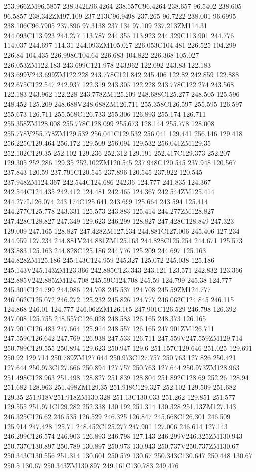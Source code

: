 253.966ZM96.5857 238.342L96.4264 238.657C96.4264 238.657 96.5402 238.605 96.5857 238.342ZM97.109 237.213C96.9498 237.265 96.7222 238.001 96.6995 238.106C96.7905 237.896 97.3138 237.134 97.109 237.213ZM114.31 244.093C113.923 244.277 113.787 244.355 113.923 244.329C113.901 244.776 114.037 244.697 114.31 244.093ZM105.027 226.053C104.481 226.525 104.299 226.84 104.435 226.998C104.64 226.683 104.822 226.368 105.027 226.053ZM122.183 243.699C121.978 243.962 122.092 243.83 122.183 243.699V243.699ZM122.228 243.778C121.842 245.406 122.82 242.859 122.888 242.675C122.547 242.937 122.319 243.305 122.228 243.778C122.274 243.568 122.183 243.962 122.228 243.778ZM125.209 248.688C125.277 248.505 125.596 248.452 125.209 248.688V248.688ZM126.711 255.358C126.597 255.595 126.597 255.673 126.711 255.568C126.733 255.306 126.893 255.174 126.711 255.358ZM128.008 255.778C128.099 255.673 128.144 255.778 128.008 255.778V255.778ZM129.532 256.041C129.532 256.041 129.441 256.146 129.418 256.225C129.464 256.172 129.509 256.094 129.532 256.041ZM129.35 252.102C129.35 252.102 129.236 252.312 129.191 252.417C129.373 252.207 129.305 252.286 129.35 252.102ZM120.545 237.948C120.545 237.948 120.567 237.843 120.59 237.791C120.545 237.896 120.545 237.922 120.545 237.948ZM124.367 242.544C124.686 242.36 124.777 241.835 124.367 242.544C124.435 242.412 124.481 242.465 124.367 242.544ZM125.414 244.277L126.074 243.174C125.641 243.699 125.664 243.594 125.414 244.277C125.778 243.331 125.573 243.883 125.414 244.277ZM128.827 247.428C128.827 247.349 129.623 246.299 128.827 247.428C128.849 247.323 129.009 247.165 128.827 247.428ZM127.234 244.881C127.006 245.406 127.234 244.959 127.234 244.881V244.881ZM125.163 244.828C125.254 244.671 125.573 243.883 125.163 244.828C125.186 244.776 125.209 244.697 125.163 244.828ZM125.186 245.143C124.959 245.327 125.072 245.038 125.186 245.143V245.143ZM123.366 242.885C123.343 243.121 123.571 242.832 123.366 242.885V242.885ZM124.708 245.59C124.708 245.59 124.799 245.38 124.777 245.301C124.799 244.986 124.708 245.537 124.708 245.59ZM124.777 246.062C125.072 246.272 125.232 245.826 124.777 246.062C124.845 246.115 124.868 246.01 124.777 246.062ZM126.165 247.901C126.529 246.798 126.392 247.008 125.755 248.557C126.028 248.583 126.165 248.373 126.165 247.901C126.483 247.664 125.914 248.557 126.165 247.901ZM126.711 247.559C126.642 247.769 126.938 247.533 126.711 247.559V247.559ZM129.714 250.789C129.555 250.894 129.623 250.947 129.6 251.157C129.646 251.025 129.691 250.92 129.714 250.789ZM127.644 250.973C127.757 250.763 127.826 250.421 127.644 250.973C127.666 250.894 127.757 250.763 127.644 250.973ZM128.963 251.498C128.963 251.498 128.827 251.839 128.804 251.892C128.69 252.26 128.94 251.682 128.963 251.498ZM129.35 251.918C129.327 252.102 129.509 251.682 129.35 251.918V251.918ZM130.328 251.13C130.033 251.262 129.851 251.577 129.555 251.971C129.282 252.338 130.192 251.314 130.328 251.13ZM127.143 246.325C126.62 246.535 126.529 246.325 126.847 245.668C126.301 246.509 125.914 247.428 125.71 248.452C125.277 247.901 127.006 246.614 127.143 246.299C126.574 246.903 126.893 246.798 127.143 246.299V246.325ZM130.943 250.737C130.897 250.789 130.897 250.973 130.943 250.737V250.737ZM130.67 250.343C130.556 251.314 130.601 250.579 130.67 250.343C130.647 250.448 130.67 250.5 130.67 250.343ZM130.897 249.161C130.783 249.476 